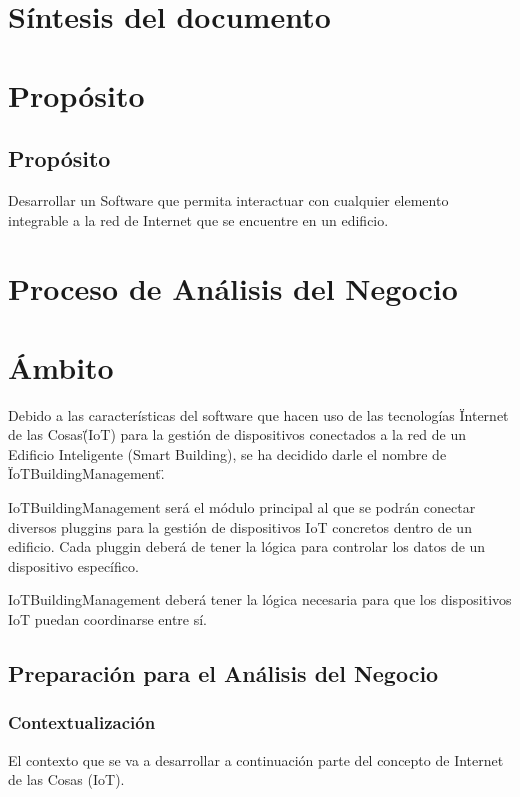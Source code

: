 \documentclass[12pt, a4paper, twoside]{article}
\begin{document}


\newpage

\tableofcontents

\section{Síntesis del documento}
\section{Propósito}
\subsection{Propósito}
Desarrollar un Software que permita interactuar con cualquier elemento 
integrable a la red de Internet que se encuentre en un edificio.
\section{Proceso de Análisis del Negocio}
\section{Ámbito}
Debido a las características del software que hacen uso de las tecnologías 
\"Internet de las Cosas\" (IoT) para la gestión de dispositivos conectados a
la red de un Edificio Inteligente (Smart Building), se ha decidido darle el nombre de
\"IoTBuildingManagement\".

IoTBuildingManagement será el módulo principal al que se podrán conectar diversos pluggins para la
gestión de dispositivos IoT concretos dentro de un edificio. Cada pluggin deberá de tener 
la lógica para controlar los datos de un dispositivo específico.

IoTBuildingManagement deberá tener la lógica necesaria para que los dispositivos IoT
puedan coordinarse entre sí.

\subsection{Preparación para el Análisis del Negocio}
\subsubsection{Contextualización}
El contexto que se va a desarrollar a continuación parte del concepto de Internet de las Cosas (IoT).
\end{document}
